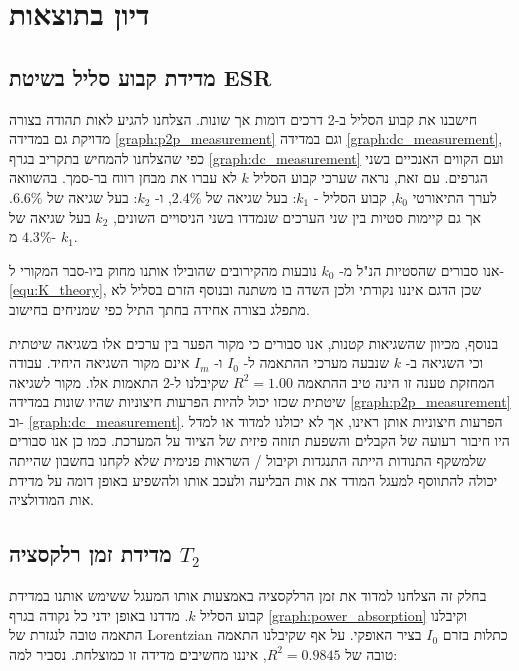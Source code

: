 \documentclass{article}
\begin{document}
\clearpage

\section{
דיון בתוצאות
}
\subsection{
מדידת קבוע סליל בשיטת
ESR}

חישבנו את קבוע הסליל ב-2 דרכים דומות אך שונות. הצלחנו להגיע לאות תהודה בצורה מדויקת גם במדידה
\ref{graph:p2p_measurement}
וגם במדידה
\ref{graph:dc_measurement},
כפי שהצלחנו להמחיש בתקריב בגרף
\ref{graph:dc_measurement}
ועם הקווים האנכיים בשני הגרפים. עם זאת, נראה שערכי קבוע הסליל
$k$
לא עברו את מבחן רווח בר-סמך. בהשוואה לערך התיאורטי
$k_0$,
קבוע הסליל -
$k_1$:
בעל שגיאה של
$2.4\%$,
ו-
$k_2$:
בעל שגיאה של
$6.6\%$.
אך גם קיימות סטיות בין שני הערכים שנמדדו בשני הניסויים השונים,
$k_2$
בעל שגיאה של 
$4.3\%$
מ-
$k_1$.

אנו סבורים שהסטיות הנ"ל מ-
$k_0$
נובעות מהקירובים שהובילו אותנו מחוק ביו-סבר המקורי ל-
\ref{equ:K_theory},
שכן הדגם איננו נקודתי ולכן השדה בו משתנה ובנוסף הזרם בסליל לא מתפלג בצורה אחידה בחתך התיל כפי שמניחים בחישוב. 

בנוסף, מכיוון שהשגיאות קטנות, אנו סבורים כי מקור הפער בין ערכים אלו בשגיאה שיטתית וכי השגיאה ב-
$k$
שנבעה מערכי ההתאמה ל-
$I_0$
ו-
$I_m$
אינם מקור השגיאה היחיד. עבודה המחזקת טענה זו הינה טיב ההתאמה
$R^2 = 1.00$
שקיבלנו ל-2 התאמות אלו.
מקור לשגיאה שיטתית שכזו יכול להיות הפרעות חיצוניות שהיו שונות במדידה
\ref{graph:p2p_measurement}
וב-
\ref{graph:dc_measurement}.
הפרעות חיצוניות אותן ראינו, אך לא יכולנו למדוד או למדל היו חיבור רעועה של הקבלים והשפעת תזוזה פיזית של הציוד על המערכת. כמו כן אנו סבורים שלמשקף התנודות הייתה התנגדות וקיבול / השראות פנימית שלא לקחנו בחשבון שהייתה יכולה להתווסף למעגל המודד את אות הבליעה ולעכב אותו ולהשפיע באופן דומה על מדידת אות המודולציה.

\subsection{
מדידת זמן רלקסציה
$T_2$
}

בחלק זה הצלחנו למדוד את זמן הרלקסציה באמצעות אותו המעגל ששימש אותנו במדידת קבוע הסליל
$k$.
מדדנו באופן ידני כל נקודה בגרף 
\ref{graph:power_absorption}
וקיבלנו התאמה טובה לנגזרת של
\textenglish{Lorentzian}
כתלות בזרם
$I_0$
בציר האופקי. על אף שקיבלנו התאמה טובה של
$R^2 = 0.9845$,
איננו מחשיבים מדידה זו כמוצלחת. נסביר למה:
\end{document}
